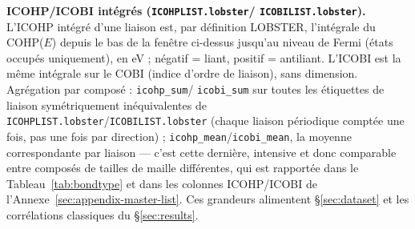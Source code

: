 \documentclass[11pt,a4paper]{article}
\begin{document}
\textbf{ICOHP/ICOBI intégrés (\texttt{ICOHPLIST.lobster}/
\texttt{ICOBILIST.lobster}).} L'ICOHP intégré d'une liaison est, par
définition LOBSTER, l'intégrale du COHP($E$) depuis le bas de la fenêtre
ci-dessus jusqu'au niveau de Fermi (états occupés uniquement), en eV ;
négatif = liant, positif = antiliant. L'ICOBI est la même intégrale sur
le COBI (indice d'ordre de liaison), sans dimension. Agrégation par
composé : \texttt{icohp\_sum}/
\texttt{icobi\_sum} sur toutes les étiquettes de liaison symétriquement
inéquivalentes de \texttt{ICOHPLIST.lobster}/\texttt{ICOBILIST.lobster}
(chaque liaison périodique comptée une fois, pas une fois par
direction) ; \texttt{icohp\_mean}/\texttt{icobi\_mean}, la moyenne
correspondante par liaison --- c'est cette dernière, intensive et donc
comparable entre composés de tailles de maille différentes, qui est
rapportée dans le Tableau~\ref{tab:bondtype} et dans les colonnes
\og{}ICOHP\fg{}/\og{}ICOBI\fg{} de l'Annexe~\ref{sec:appendix-master-list}.
Ces grandeurs alimentent \S\ref{sec:dataset} et les corrélations
classiques du \S\ref{sec:results}.
\end{document}

